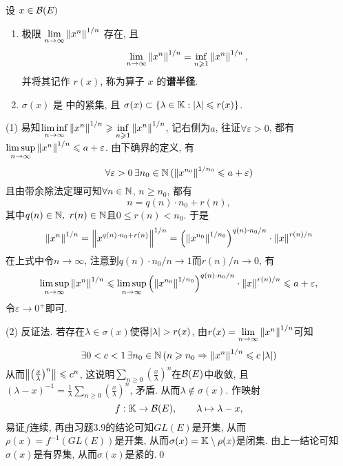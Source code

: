 	\begin{Theorem}[谱半径]\label{thm:谱半径}
		设 $ x\in\mathcal{B}(E) $
		\begin{enumerate}[(1)]
			\item 极限 $ \lim\limits_{n\to\infty} \left\| x^{n} \right\|^{1/n} $ 存在, 且
			\[
				\lim_{n\to\infty}\left\| x^{n} \right\|^{1/n}=\inf_{n\geqslant1}\left\| x^{n} \right\|^{1/n},
			\]
			并将其记作 $ r(x) $, 称为算子 $ x $ 的\textbf{谱半径}. 
			\item $ \sigma(x) $ 是 \K 中的紧集, 且 $ \sigma(x)\subset\{ \lambda\in\mathbb{K}:\left| \lambda \right| \leqslant r(x) \} $. 
		\end{enumerate}
	\end{Theorem}
	\begin{Proof}
		(1) 易知$ \liminf\limits_{n\to\infty}\left\| x^n \right\|^{1/n}\geqslant\inf\limits_{n\geqslant 1}\left\| x^n \right\|^{1/n} $, 记右侧为$ a $, 往证$ \forall\varepsilon>0 $, 都有$ \limsup\limits_{n\to\infty}\left\| x^n \right\|^{1/n}\leqslant a+\varepsilon $. 由下确界的定义, 有
		\[
		\forall\varepsilon>0\,\exists n_0\in\mathbb{N}\,(\left\| x^{n_0} \right\|^{1/n_0}\leqslant a+\varepsilon)
		\]
		且由带余除法定理可知$ \forall n\in\mathbb{N} $, $ n\geqslant n_0 $, 都有
		\[
		n=q(n)\cdot n_0+r(n),
		\]
		其中$ q(n)\in\N,\ r(n)\in\N $且$ 0\leqslant r(n)<n_0 $. 于是
		\[
		\left\| x^n \right\|^{1/n}=\left\| x^{q(n)\cdot n_0+r(n)} \right\|^{1/n}=\left(\left\| x^{n_0} \right\|^{1/n_0}\right)^{q(n)\cdot n_0/n}\cdot\left\| x \right\|^{r(n)/n}
		\]
		在上式中令$ n\to\infty $, 注意到$ q(n)\cdot n_0/n\to 1 $而$ r(n)/n\to 0 $, 有
		\[
		\limsup_{n\to\infty}\left\| x^n \right\|^{1/n}\leqslant\limsup_{n\to\infty}\left(\left\| x^{n_0} \right\|^{1/n_0}\right)^{q(n)\cdot n_0/n}\cdot\left\| x \right\|^{r(n)/n}\leqslant a+\varepsilon,
		\]
		令$ \varepsilon\to 0^+ $即可.
		
		(2) 反证法. 若存在$ \lambda\in\sigma(x) $使得$ \left| \lambda \right| >r(x) $, 由$ r(x)=\lim\limits_{n\to\infty}\left\| x^n \right\|^{1/n} $可知
		\[
		\exists 0<c<1\,\exists n_0\in\mathbb{N}\,(n\geqslant n_0\Rightarrow\left\| x^n \right\|^{1/n}\leqslant c\left| \lambda \right| )
		\]
		从而$ \left\| \left(\frac{x}{\lambda}\right)^n \right\|\leqslant c^n $, 这说明$ \sum\limits_{n\geqslant 0}\left(\frac{x}{\lambda}\right)^n $在$ \mathcal{B}(E) $中收敛, 且$ (\lambda-x)^{-1}=\frac{1}{\lambda}\sum\limits_{n\geqslant 0}\left(\frac{x}{\lambda}\right)^n $, 矛盾. 从而$ \lambda\notin\sigma(x) $. 作映射
		\[
		f : \mathbb{K}\to\mathcal{B}(E),\qquad \lambda\mapsto\lambda-x,
		\]
		易证$ f $连续, 再由习题3.9的结论可知$ GL(E) $是开集, 从而$ \rho(x)=f^{-1}(GL(E)) $是开集, 从而$ \sigma(x)=\mathbb{K}\setminus\rho(x) $是闭集. 由上一结论可知$ \sigma(x) $是有界集, 从而$ \sigma(x) $是紧的.\qed
	\end{Proof}

